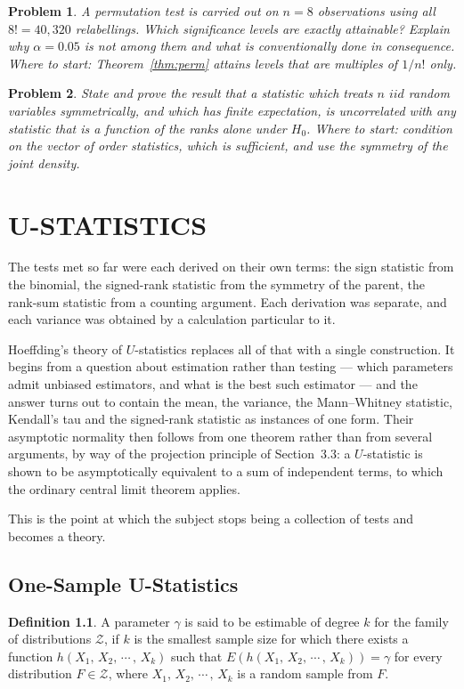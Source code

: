 \documentclass[12pt,a4paper]{report}
\theoremstyle{definition}
\newtheorem{defn}[thm]{Definition}
\theoremstyle{plain}
\newtheorem{problemx}{Problem}[section]
\newenvironment{problem}{\begin{problemx}}{\end{problemx}}
\begin{document}
\begin{problem}
A permutation test is carried out on $n=8$ observations using all $8!=40{,}320$
relabellings. Which significance levels are exactly attainable? Explain why
$\alpha=0.05$ is not among them and what is conventionally done in consequence.
\emph{Where to start: Theorem~\ref{thm:perm} attains levels that are multiples of $1/n!$ only.}
\end{problem}

\begin{problem}
State and prove the result that a statistic which treats $n$ $iid$ random
variables symmetrically, and which has finite expectation, is uncorrelated with
any statistic that is a function of the ranks alone under $H_0$.
\emph{Where to start: condition on the vector of order statistics, which is sufficient, and use the symmetry of the joint density.}
\end{problem}


\chapter{U-STATISTICS}

The tests met so far were each derived on their own terms: the sign statistic
from the binomial, the signed-rank statistic from the symmetry of the parent,
the rank-sum statistic from a counting argument. Each derivation was separate,
and each variance was obtained by a calculation particular to it.

Hoeffding's theory of $U$-statistics replaces all of that with a single
construction. It begins from a question about estimation rather than testing ---
which parameters admit unbiased estimators, and what is the best such estimator
--- and the answer turns out to contain the mean, the variance, the
Mann--Whitney statistic, Kendall's tau and the signed-rank statistic as
instances of one form. Their asymptotic normality then follows from one theorem
rather than from several arguments, by way of the projection principle of
Section~3.3: a $U$-statistic is shown to be asymptotically equivalent to a sum
of independent terms, to which the ordinary central limit theorem applies.

This is the point at which the subject stops being a collection of tests and
becomes a theory.


\section{One-Sample U-Statistics}
\begin{defn}
A parameter $\gamma$ is said to be estimable of degree $k$ for the family of distributions $\mathscr{Z}$, if $k$ is the smallest sample size for which there exists a function $h(X_1,\, X_2,\, \cdots\, , \, X_k)$ such that $E\left(h(X_1,\, X_2,\, \cdots\, , \, X_k)\right) = \gamma$ for every distribution $F\in\mathscr{Z}$, where $X_1, \, X_2, \, \cdots\, , \, X_k$ is a random sample from $F$.
\end{defn}
\end{document}
